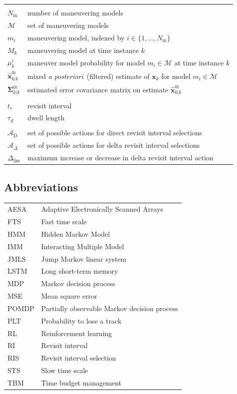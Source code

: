 \documentclass[english, 12pt, a4paper, elec, utf8, a-1b, online]{aaltothesis}
\renewcommand{\vec}[1]{\mathbf{#1}}
\newcommand{\As}{\mathcal{A}}
\newcommand{\x}{\vec{x}_k}
\newcommand{\modeprob}{\mu_k^i}
\newcommand{\xmxinitcurr}{\hat{\vec{x}}^{0i}_{k|k}}
\newcommand{\ecovmxinitcurr}{\bm{\Sigma}^{0i}_{k|k}}
\newcommand{\deltalim}{\Delta_\text{lim}}
\newcommand{\Asdir}{\As_\text{D}}
\newcommand{\Asdelta}{\As_\Delta}
\def\post{\textit{a posteriori}\ }
\newcommand{\mimm}{\mathcal{M}}
\newcommand{\nmodels}{{N_\text{m}}}
\begin{document}
\begin{longtable}{ll}
&\\
$\nmodels$ & number of maneuvering models \\
$\mimm$ & set of maneuvering models \\
$m_i$ & maneuvering model, indexed by $i \in \{1, ..., \nmodels\}$ \\
$M_k$ & maneuvering model at time instance $k$ \\
$\modeprob$ & maneuver model probability for model $m_i \in \mimm$ at time instance $k$ \\
$\xmxinitcurr$ & mixed \post (filtered) estimate of $\x$ for model $m_i \in \mimm$\\
$\ecovmxinitcurr$ & estimated error covariance matrix on estimate $\xmxinitcurr$\\
&\\
$t_r$ & revisit interval \\
$\tau_d$ & dwell length \\
&\\
$\Asdir$ & set of possible actions for direct revisit interval selections \\
$\Asdelta$ & set of possible actions for delta revisit interval selections \\
$\deltalim$ & maximum increase or decrease in delta revisit interval action \\
\end{longtable}

\subsection*{Abbreviations}

\begin{tabular}{ll}
AESA & Adaptive Electronically Scanned Arrays \\
FTS & Fast time scale \\
HMM & Hidden Markov Model \\
IMM & Interacting Multiple Model \\
JMLS & Jump Markov linear system \\
LSTM & Long short-term memory \\
MDP & Markov decision process \\
MSE & Mean square error \\
POMDP      & Partially observable Markov decision process \\
PLT & Probability to lose a track \\
RL & Reinforcement learning \\
RI  & Revisit interval \\
RIS & Revisit interval selection \\
STS & Slow time scale \\
TBM & Time budget management \\
\end{tabular}
\end{document}
